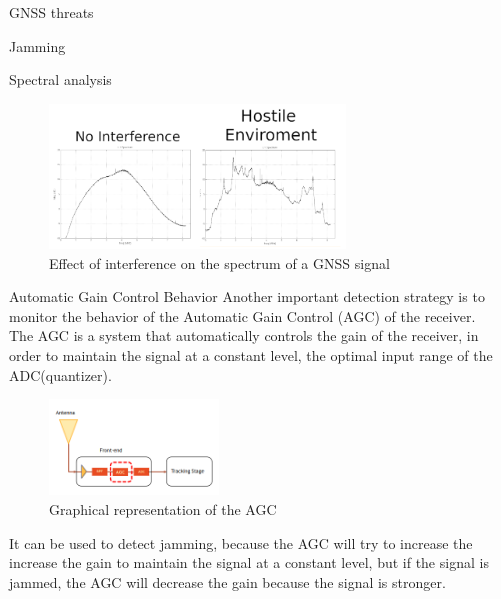 \begin{section}{GNSS threats}
\begin{subsection}{Jamming}
\begin{subsubsection}{Spectral analysis}
          \begin{figure}[h]
            \centering
            \includegraphics[width=0.7\textwidth]{img/wireless/spectrum effect.png}
            \caption{Effect of interference on the spectrum of a GNSS signal}
            \label{fig:GNSS spectral analysis}
          \end{figure}
        \end{subsubsection}
        \begin{subsubsection}{Automatic Gain Control Behavior}
          Another important detection strategy is to monitor the behavior of the Automatic Gain Control
          (AGC) of the receiver.\\

          The AGC is a system that automatically controls the gain of the receiver, in order to
          maintain the signal at a constant level, the optimal input range of the ADC(quantizer).\\
          \begin{figure}[h]
            \centering
            \includegraphics[width=0.4\textwidth]{img/wireless/AGC.png}
            \caption{Graphical representation of the AGC}
            \label{fig:AGC}
          \end{figure}
        It can be used to detect jamming, because the AGC will try to increase the increase the gain
        to maintain the signal at a constant level, but if the signal is jammed, the AGC will 
        decrease the gain because the signal is stronger.\\


\end{subsubsection}
\end{subsection}
\end{section}
